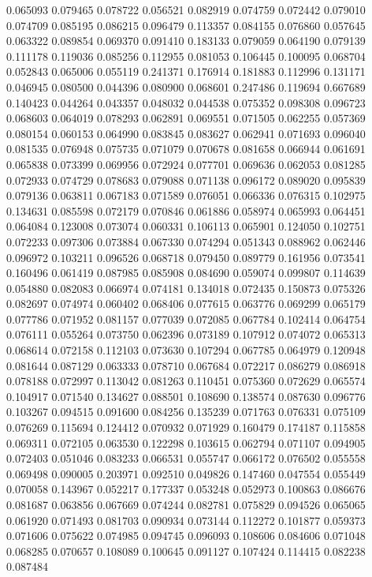 0.065093
0.079465
0.078722
0.056521
0.082919
0.074759
0.072442
0.079010
0.074709
0.085195
0.086215
0.096479
0.113357
0.084155
0.076860
0.057645
0.063322
0.089854
0.069370
0.091410
0.183133
0.079059
0.064190
0.079139
0.111178
0.119036
0.085256
0.112955
0.081053
0.106445
0.100095
0.068704
0.052843
0.065006
0.055119
0.241371
0.176914
0.181883
0.112996
0.131171
0.046945
0.080500
0.044396
0.080900
0.068601
0.247486
0.119694
0.667689
0.140423
0.044264
0.043357
0.048032
0.044538
0.075352
0.098308
0.096723
0.068603
0.064019
0.078293
0.062891
0.069551
0.071505
0.062255
0.057369
0.080154
0.060153
0.064990
0.083845
0.083627
0.062941
0.071693
0.096040
0.081535
0.076948
0.075735
0.071079
0.070678
0.081658
0.066944
0.061691
0.065838
0.073399
0.069956
0.072924
0.077701
0.069636
0.062053
0.081285
0.072933
0.074729
0.078683
0.079088
0.071138
0.096172
0.089020
0.095839
0.079136
0.063811
0.067183
0.071589
0.076051
0.066336
0.076315
0.102975
0.134631
0.085598
0.072179
0.070846
0.061886
0.058974
0.065993
0.064451
0.064084
0.123008
0.073074
0.060331
0.106113
0.065901
0.124050
0.102751
0.072233
0.097306
0.073884
0.067330
0.074294
0.051343
0.088962
0.062446
0.096972
0.103211
0.096526
0.068718
0.079450
0.089779
0.161956
0.073541
0.160496
0.061419
0.087985
0.085908
0.084690
0.059074
0.099807
0.114639
0.054880
0.082083
0.066974
0.074181
0.134018
0.072435
0.150873
0.075326
0.082697
0.074974
0.060402
0.068406
0.077615
0.063776
0.069299
0.065179
0.077786
0.071952
0.081157
0.077039
0.072085
0.067784
0.102414
0.064754
0.076111
0.055264
0.073750
0.062396
0.073189
0.107912
0.074072
0.065313
0.068614
0.072158
0.112103
0.073630
0.107294
0.067785
0.064979
0.120948
0.081644
0.087129
0.063333
0.078710
0.067684
0.072217
0.086279
0.086918
0.078188
0.072997
0.113042
0.081263
0.110451
0.075360
0.072629
0.065574
0.104917
0.071540
0.134627
0.088501
0.108690
0.138574
0.087630
0.096776
0.103267
0.094515
0.091600
0.084256
0.135239
0.071763
0.076331
0.075109
0.076269
0.115694
0.124412
0.070932
0.071929
0.160479
0.174187
0.115858
0.069311
0.072105
0.063530
0.122298
0.103615
0.062794
0.071107
0.094905
0.072403
0.051046
0.083233
0.066531
0.055747
0.066172
0.076502
0.055558
0.069498
0.090005
0.203971
0.092510
0.049826
0.147460
0.047554
0.055449
0.070058
0.143967
0.052217
0.177337
0.053248
0.052973
0.100863
0.086676
0.081687
0.063856
0.067669
0.074244
0.082781
0.075829
0.094526
0.065065
0.061920
0.071493
0.081703
0.090934
0.073144
0.112272
0.101877
0.059373
0.071606
0.075622
0.074985
0.094745
0.096093
0.108606
0.084606
0.071048
0.068285
0.070657
0.108089
0.100645
0.091127
0.107424
0.114415
0.082238
0.087484
